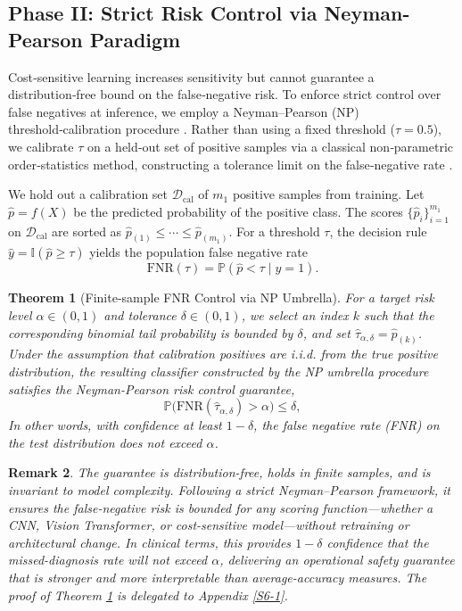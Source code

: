 \documentclass[journal,twoside,web]{ieeecolor}
\newtheorem{theorem}{Theorem}[section]
\newtheorem{remark}[theorem]{Remark}
\begin{document}
\subsection{Phase II: Strict Risk Control via Neyman-Pearson Paradigm}
\label{sec:phase2_method}

Cost‑sensitive learning increases sensitivity but cannot guarantee a distribution‑free bound on the false‑negative risk. To enforce strict control over false negatives at inference, we employ a Neyman–Pearson (NP) threshold‑calibration procedure \cite{rigollet2011neyman,tong2018neyman}. Rather than using a fixed threshold (\(\tau = 0.5\)), we calibrate \(\tau\) on a held‑out set of positive samples via a classical non‑parametric order‑statistics method, constructing a tolerance limit on the false‑negative rate \cite{wilks1941determination}.

We hold out a calibration set $\mathcal{D}_{\mathrm{cal}}$ of $m_1$ positive samples from training. Let $\hat{p} = f(X)$ be the predicted probability of the positive class. The scores $\{\hat{p}_i\}_{i=1}^{m_1}$ on $\mathcal{D}_{\mathrm{cal}}$ are sorted as $\hat{p}_{(1)} \le \cdots \le \hat{p}_{(m_1)}$. For a threshold $\tau$, the decision rule $\hat{y} = \mathbb{I}(\hat{p} \ge \tau)$ yields the population false negative rate
\[
\mathrm{FNR}(\tau) = \mathbb{P}(\hat{p} < \tau \mid y = 1).
\]

\begin{theorem}[Finite-sample FNR Control via NP Umbrella]\label{Th1}
For a target risk level $\alpha\in(0,1)$ and tolerance $\delta\in(0,1)$, we select an index $k$ such that the corresponding binomial tail probability is bounded by $\delta$, and set $\hat{\tau}_{\alpha,\delta} = \hat{p}_{(k)}$. Under the assumption that calibration positives are i.i.d. from the true positive distribution, the resulting classifier constructed by the NP umbrella procedure satisfies the Neyman-Pearson risk control guarantee,
\[
\mathbb{P}\bigl(\mathrm{FNR}(\hat{\tau}_{\alpha,\delta}) > \alpha\bigr)
\leq \delta,
\]
In other words, with confidence at least $1-\delta$, the false negative rate (FNR) on the test distribution does not exceed $\alpha$.
\end{theorem}

\begin{remark}
The guarantee is distribution-free, holds in finite samples, and is invariant to model complexity. Following a strict Neyman--Pearson framework, it ensures the false-negative risk is bounded for any scoring function---whether a CNN, Vision Transformer, or cost-sensitive model---without retraining or architectural change. In clinical terms, this provides $1-\delta$ confidence that the missed-diagnosis rate will not exceed $\alpha$, delivering an operational safety guarantee that is stronger and more interpretable than average-accuracy measures. The proof of Theorem \ref{Th1} is delegated to Appendix \ref{S6-1}.
\end{remark}
\end{document}

